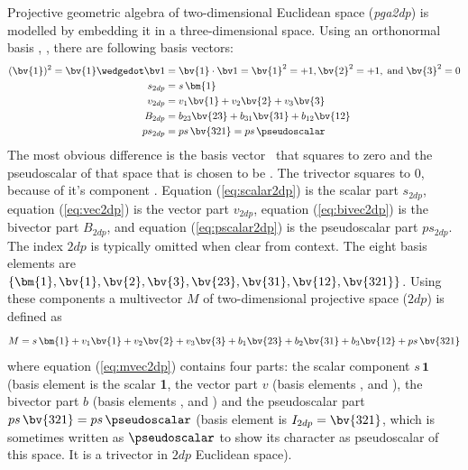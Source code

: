 Projective geometric algebra of two-dimensional Euclidean space (\emph{pga2dp}) is
modelled by embedding it in a three-dimensional space. Using an orthonormal basis ,
,  there are following basis vectors:
\begin{subequations}
    \begin{align}
        (\bv{1})^2 = \bv{1} \wedgedot \bv1 & = \bv{1} \cdot \bv1 = \bv{1}^2 = +1,
        \bv{2}^2 = +1, \;\text{and}\; \bv{3}^2 = 0  \nonumber\\ 
        s_{2dp} & = s \, \bm{1}
        \label{eq:scalar2dp} \\
        v_{2dp} & = v_1\bv{1} + v_2\bv{2} + v_3\bv{3} 
        \label{eq:vec2dp} \\ 
        B_{2dp} & = b_{23}\bv{23} + b_{31}\bv{31} + b_{12}\bv{12} 
        \label{eq:bivec2dp} \\ 
        ps_{2dp} & = ps \, \bv{321}  = ps \, \pseudoscalar
        \label{eq:pscalar2dp}
    \end{align}
\end{subequations}
The most obvious difference is the basis vector~ that squares to zero and the
pseudoscalar of that space that is chosen to be . The trivector  squares
to $0$, because of it's component . Equation (\ref{eq:scalar2dp}) is the scalar part
$s_{2dp}$, equation (\ref{eq:vec2dp}) is the vector part $v_{2dp}$, equation
(\ref{eq:bivec2dp}) is the bivector part $B_{2dp}$, and equation (\ref{eq:pscalar2dp}) is
the pseudoscalar part $ps_{2dp}$. The index $2dp$ is typically omitted when clear from
context. The eight basis elements are $\{\bm{1}, \bv{1}, \bv{2}, \bv{3}, \bv{23}, \bv{31},
\bv{12}, \bv{321}\}$. Using these components a multivector $M$ of two-dimensional
projective space ($2dp$) is defined as
\begin{equation}
    M = s \, \bm{1} + v_1\bv{1} + v_2\bv{2} + v_3\bv{3} 
    + b_1\bv{23} + b_2\bv{31} + b_3\bv{12} + ps \, \bv{321}
    \label{eq:mvec2dp}  
\end{equation}
where equation (\ref{eq:mvec2dp}) contains four parts: the scalar component $s \, \bm{1}$
(basis element is the scalar \textbf{1}, the vector part $v$ (basis elements ,
 and ), the bivector part $b$ (basis elements ,  and )
and the pseudoscalar part $ps \, \bv{321} = ps \, \pseudoscalar$ (basis element is
$I_{2dp} = \bv{321}$, which is sometimes written as $\pseudoscalar$ to show its character
as pseudoscalar of this space. It is a trivector in $2dp$ Euclidean space). \\

